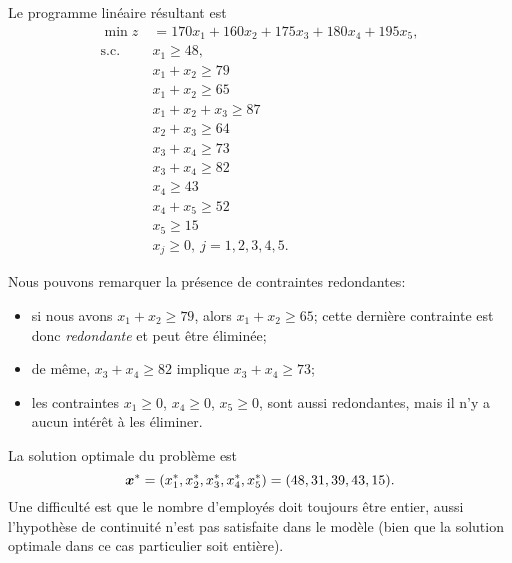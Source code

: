 \begin{example}
Le programme linéaire résultant est
\begin{align*}
\min z \ & = 170 x_1 + 160 x_2 + 175 x_3 + 180 x_4 + 195 x_5, \\
\mbox{s.c. } & x_1 \geq 48, \\
& x_1 + x_2 \geq 79 \\
& x_1 + x_2 \geq 65 \\
& x_1 + x_2 + x_3 \geq 87 \\
& x_2 + x_3 \geq 64 \\
& x_3 + x_4 \geq 73 \\
& x_3 + x_4 \geq 82 \\
& x_4 \geq 43 \\
& x_4 + x_5 \geq 52 \\
& x_5 \geq 15 \\
& x_j \geq 0,\ j = 1,2,3,4,5.
\end{align*}

Nous pouvons remarquer la présence de contraintes redondantes:
\begin{itemize}
\item
si nous avons $x_1 + x_2 \geq 79$, alors $x_1 + x_2 \geq 65$; cette dernière contrainte est donc {\sl redondante} et peut être éliminée;
\item
de même, $x_3 + x_4 \geq 82$ implique $x_3 + x_4 \geq 73$;
\item
les contraintes $x_1 \geq 0$, $x_4 \geq 0$, $x_5 \geq 0$, sont aussi redondantes, mais il n'y a aucun intérêt à les éliminer.
\end{itemize}
La solution optimale du problème est
\[
\boldsymbol{x}^* = (x^*_1, x^*_2, x^*_3, x^*_4, x^*_5) = (48, 31, 39, 43, 15).
\]
Une difficulté est que le nombre d'employés doit toujours être entier, aussi l'hypothèse de continuité n'est pas satisfaite dans le modèle (bien que la solution optimale dans ce cas particulier soit entière).
\end{example}

